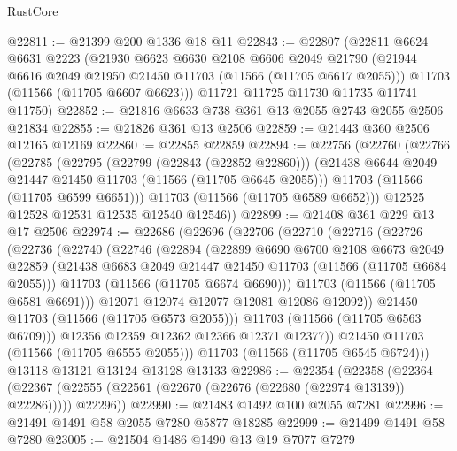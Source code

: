 \begin{lexlean}{RustCore}
\begin{coremodule}
@22811 := @21399 @200 @1336 @18 @11
@22843 := @22807
    (@22811
      @6624
      @6631
      @2223
      (@21930
        @6623
        @6630
        @2108
        @6606
        @2049
        @21790
        (@21944 @6616 @2049 @21950 @21450 @11703 (@11566 (@11705 @6617 @2055)))
        @11703
        (@11566 (@11705 @6607 @6623)))
      @11721
      @11725
      @11730
      @11735
      @11741
      @11750)
@22852 := @21816 @6633 @738 @361 @13 @2055 @2743 @2055 @2506 @21834
@22855 := @21826 @361 @13 @2506
@22859 := @21443 @360 @2506 @12165 @12169
@22860 := @22855 @22859
@22894 := @22756
    (@22760
      (@22766
        (@22785
          (@22795
            (@22799 (@22843 (@22852 @22860)))
            (@21438 @6644 @2049 @21447 @21450 @11703 (@11566 (@11705 @6645 @2055)))
            @11703
            (@11566 (@11705 @6599 @6651)))
          @11703
          (@11566 (@11705 @6589 @6652)))
        @12525
        @12528
        @12531
        @12535
        @12540
        @12546))
@22899 := @21408 @361 @229 @13 @17 @2506
@22974 := @22686
    (@22696
      (@22706
        (@22710
          (@22716
            (@22726
              (@22736
                (@22740
                  (@22746
                    (@22894
                      (@22899
                        @6690
                        @6700
                        @2108
                        @6673
                        @2049
                        @22859
                        (@21438 @6683 @2049 @21447 @21450 @11703 (@11566 (@11705 @6684 @2055)))
                        @11703
                        (@11566 (@11705 @6674 @6690)))
                      @11703
                      (@11566 (@11705 @6581 @6691)))
                    @12071
                    @12074
                    @12077
                    @12081
                    @12086
                    @12092))
                @21450
                @11703
                (@11566 (@11705 @6573 @2055)))
              @11703
              (@11566 (@11705 @6563 @6709)))
            @12356
            @12359
            @12362
            @12366
            @12371
            @12377))
        @21450
        @11703
        (@11566 (@11705 @6555 @2055)))
      @11703
      (@11566 (@11705 @6545 @6724)))
    @13118
    @13121
    @13124
    @13128
    @13133
@22986 := @22354
    (@22358
      (@22364 (@22367 (@22555 (@22561 (@22670 (@22676 (@22680 (@22974 @13139)) @22286))))) @22296))
@22990 := @21483 @1492 @100 @2055 @7281
@22996 := @21491 @1491 @58 @2055 @7280 @5877 @18285
@22999 := @21499 @1491 @58 @7280
@23005 := @21504 @1486 @1490 @13 @19 @7077 @7279

\end{coremodule}
\end{lexlean}
